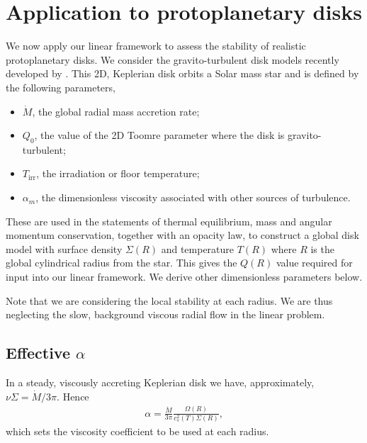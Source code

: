 \section{Application to protoplanetary disks}\label{2dppd}
We now apply our linear framework to assess the stability of realistic 
protoplanetary disks. We consider the gravito-turbulent disk models recently
developed by \cite{rafikov15}. This 2D, Keplerian disk orbits a Solar 
mass star and is defined by the following parameters, 

\begin{itemize}
  \item $\dot{M}$, the global radial mass accretion rate;
  \item $Q_0$, the value of the 2D Toomre parameter where the disk is
    gravito-turbulent;
  \item $T_\mathrm{irr}$, the irradiation or floor temperature;
  \item $\alpha_m$, the dimensionless viscosity associated with other
    sources of turbulence.
\end{itemize} 
These are used in the statements of thermal equilibrium, mass and
angular momentum conservation, together with an opacity law, 
to construct a global disk model with surface density $\Sigma(R)$ and
temperature $T(R)$ where $R$ is the global cylindrical radius from the
star. \citep[See][for details.]{rafikov15} This gives the $Q(R)$
value required for input into our linear framework. We derive other
dimensionless parameters below. 

Note that we are considering the local stability at each radius. We
are thus neglecting the slow, background viscous radial flow in the
linear problem. 


\subsection{Effective $\alpha$}
In a steady, viscously accreting Keplerian disk we have,
approximately, $\nu\Sigma = \dot{M}/3\pi$. Hence
\begin{align}
  \alpha = \frac{\dot{M}}{3\pi}\frac{\Omega(R)}{c_{s}^2(T)\Sigma(R)},  
\end{align} 
which sets the viscosity coefficient to be used at each radius. 


